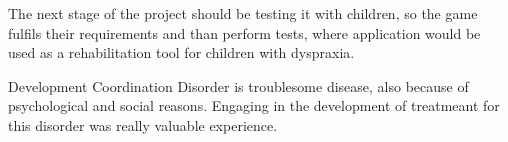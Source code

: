 The next stage of the project should be testing it with children, so the game fulfils their requirements and than perform tests, where application would be used as a rehabilitation tool for children with dyspraxia.

Development Coordination Disorder is troublesome disease, also because of psychological and social reasons. Engaging in the development of treatmeant for this disorder was really valuable experience.

